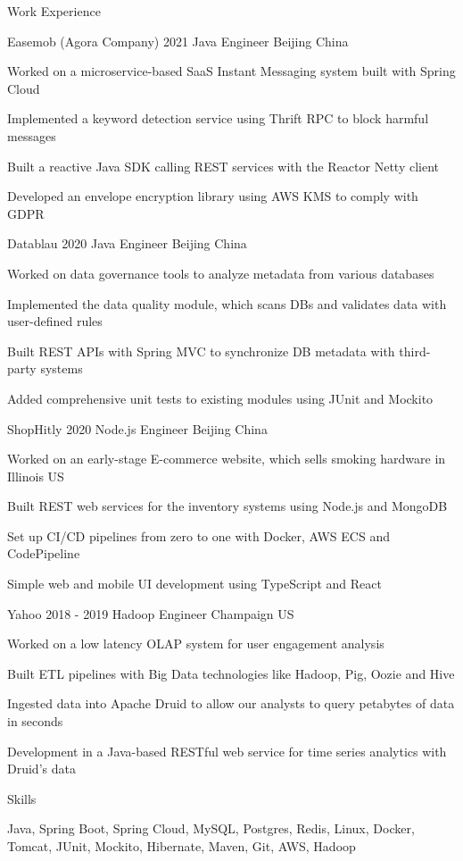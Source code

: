 \documentclass{resume} %
\begin{document}
\begin{rSection}{Work Experience}

\begin{rSubsection}
{Easemob (Agora Company)} {2021} {Java Engineer} {Beijing China}
\item Worked on a microservice-based SaaS Instant Messaging system built with Spring Cloud
\item Implemented a keyword detection service using Thrift RPC to block harmful messages
\item Built a reactive Java SDK calling REST services with the Reactor Netty client
\item Developed an envelope encryption library using AWS KMS to comply with GDPR
\end{rSubsection}

\begin{rSubsection}
{Datablau} {2020} {Java Engineer} {Beijing China}
\item Worked on data governance tools to analyze metadata from various databases
\item Implemented the data quality module, which scans DBs and validates data with user-defined rules
\item Built REST APIs with Spring MVC to synchronize DB metadata with third-party systems
\item Added comprehensive unit tests to existing modules using JUnit and Mockito
\end{rSubsection}

\begin{rSubsection}
{ShopHitly} {2020} {Node.js Engineer} {Beijing China}
\item Worked on an early-stage E-commerce website, which sells smoking hardware in Illinois US
\item Built REST web services for the inventory systems using Node.js and MongoDB
\item Set up CI/CD pipelines from zero to one with Docker, AWS ECS and CodePipeline
\item Simple web and mobile UI development using TypeScript and React
\end{rSubsection}

\begin{rSubsection}
{Yahoo} {2018 - 2019} {Hadoop Engineer} {Champaign US}
\item Worked on a low latency OLAP system for user engagement analysis
\item Built ETL pipelines with Big Data technologies like Hadoop, Pig, Oozie and Hive
\item Ingested data into Apache Druid to allow our analysts to query petabytes of data in seconds
\item Development in a Java-based RESTful web service for time series analytics with Druid's data
\end{rSubsection}

\end{rSection}

\begin{skillSection}{Skills}
\item Java, Spring Boot, Spring Cloud, MySQL, Postgres, Redis, Linux, Docker, Tomcat, JUnit, Mockito, Hibernate, Maven, Git, AWS, Hadoop
\end{skillSection}
\end{document}
